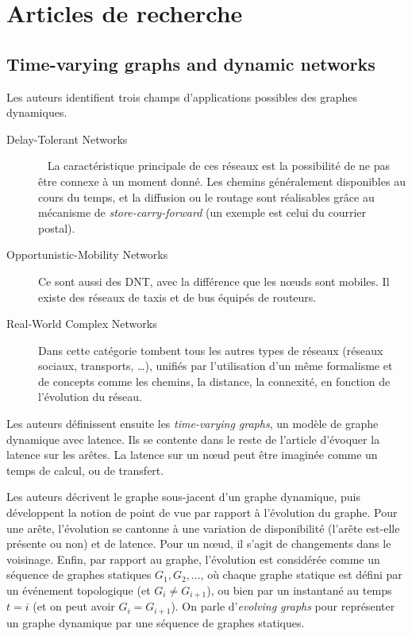 \documentclass[12pt,a4paper]{article}
\begin{document}
\section{Articles de recherche}
\subsection{Time-varying graphs and dynamic
  networks~\cite{casteigts2012time}}
Les auteurs identifient trois champs d'applications possibles des
graphes dynamiques.
\begin{description}
\item[Delay-Tolerant Networks]~\cite{fall2007delay} La caractéristique
  principale de ces réseaux est la possibilité de ne pas être connexe
  à un moment donné. Les chemins généralement disponibles au cours du
  temps, et la diffusion ou le routage sont réalisables grâce au
  mécanisme de \textit{store-carry-forward} (un exemple est celui du
  courrier postal).
\item[Opportunistic-Mobility Networks] Ce sont aussi des DNT, avec la
  différence que les nœuds sont mobiles. Il existe des réseaux de
  taxis et de bus équipés de routeurs.
\item[Real-World Complex Networks] Dans cette catégorie tombent tous
  les autres types de réseaux (réseaux sociaux, transports, …),
  unifiés par l'utilisation d'un même formalisme et de concepts comme
  les chemins, la distance, la connexité, en fonction de l'évolution
  du réseau.
\end{description}

Les auteurs définissent ensuite les \textit{time-varying graphs}, un
modèle de graphe dynamique avec latence. Ils se contente dans le reste
de l'article d'évoquer la latence sur les arêtes. La latence sur un
nœud peut être imaginée comme un temps de calcul, ou de transfert.

Les auteurs décrivent le graphe sous-jacent d'un graphe dynamique,
puis développent la notion de point de vue par rapport à l'évolution
du graphe. Pour une arête, l'évolution se cantonne à une variation de
disponibilité (l'arête est-elle présente ou non) et de latence. Pour
un nœud, il s'agit de changements dans le voisinage. Enfin, par
rapport au graphe, l'évolution est considérée comme un séquence de
graphes statiques \(G_1, G_2, \dots\), où chaque graphe statique est
défini par un événement topologique (et \(G_i \neq G_{i+1}\)), ou bien
par un instantané au temps \(t = i\) (et on peut avoir
\(G_i = G_{i+1}\)). On parle d'\textit{evolving graphs} pour
représenter un graphe dynamique par une séquence de graphes statiques.
\end{document}

